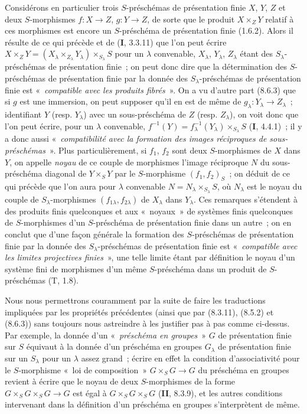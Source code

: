 \begin{scholium}[8.8.3]
Considérons en particulier trois $S$-préschémas de présentation finie $X$,
$Y$, $Z$ et deux $S$-morphismes $f:X\to Z$, $g:Y\to Z$, de sorte que le
produit $X\times_ZY$ relatif à ces morphismes est encore un $S$-préschéma de
présentation finie (1.6.2). Alors il résulte de ce qui précède et de
(\textbf{I}, 3.3.11) que l'on peut écrire
$X\times_ZY=(X_\lambda\times_{Z_\lambda}Y_\lambda)\times_{S_\lambda}S$ pour
un $\lambda$ convenable, $X_\lambda$, $Y_\lambda$, $Z_\lambda$ étant des
$S_\lambda$-préschémas de présentation finie~; on peut donc dire que la
détermination des $S$-préschémas de présentation finie par la donnée des
$S_\lambda$-préschémas de présentation finie est «~\emph{compatible avec les
produits fibrés}~». On a vu d'autre part (8.6.3) que si $g$ est une immersion,
on peut supposer qu'il en est de même de $g_\lambda:Y_\lambda\to Z_\lambda$~;
identifiant $Y$ (resp. $Y_\lambda$) avec un sous-préschéma de $Z$ (resp.
$Z_\lambda$), on voit donc que l'on peut écrire, pour un $\lambda$ convenable,
$f^{-1}(Y)=f_\lambda^{-1}(Y_\lambda)\times_{S_\lambda}S$ (\textbf{I}, 4.4.1)~; il y a
donc aussi «~\emph{compatibilité avec la formation des images réciproques de
sous-préschémas}~». Plus particulièrement, si $f_1$, $f_2$ sont deux
$S$-morphismes de $X$ dans $Y$, on appelle \emph{noyau} de ce couple de
morphismes l'image réciproque $N$ du sous-préschéma diagonal de $Y\times_SY$
par le $S$-morphisme $(f_1,f_2)_S$~; on déduit de ce qui précède que l'on aura
pour $\lambda$ convenable $N=N_\lambda\times_{S_\lambda}S$, où $N_\lambda$
est le noyau du couple de $S_\lambda$-morphismes
$(f_{1\lambda},f_{2\lambda})$ de $X_\lambda$ dans $Y_\lambda$. Ces remarques
s'étendent à des produits finis quelconques et aux «~noyaux~» de systèmes
finis quelconques de $S$-morphismes d'un $S$-préschéma de présentation finie
dans un autre~; on en conclut que d'une façon générale la formation des
$S$-préschémas de présentation finie par la donnée des
$S_\lambda$-préschémas de présentation finie est «~\emph{compatible avec les
limites projectives finies}~», une telle limite étant par définition le noyau
d'un système fini de morphismes d'un même $S$-préschéma dans un produit de
$S$-préschémas (T, 1.8).

Nous nous permettrons couramment par la suite de faire les traductions
impliquées par les propriétés précédentes (ainsi que par (8.3.11), (8.5.2) et
(8.6.3)) sans toujours nous astreindre à les justifier pas à pas comme
ci-dessus. Par exemple, la donnée d'un «~\emph{préschéma en groupes}~» $G$ de
présentation finie sur $S$ équivaut à la donnée d'un préschéma en groupes
$G_\lambda$ de présentation finie sur un $S_\lambda$ pour un $\lambda$ assez
grand~; écrire en effet la condition d'associativité pour le $S$-morphisme
«~loi de composition~» $G\times_SG\to G$ du préschéma en groupes revient à
écrire que le noyau de deux $S$-morphismes de la forme
$G\times_SG\times_SG\to G$ est égal à $G\times_SG\times_SG$ (\textbf{II}, 8.3.9), et
les autres conditions intervenant dans la définition d'un préschéma en
groupes s'interprètent de même.
\end{scholium}

